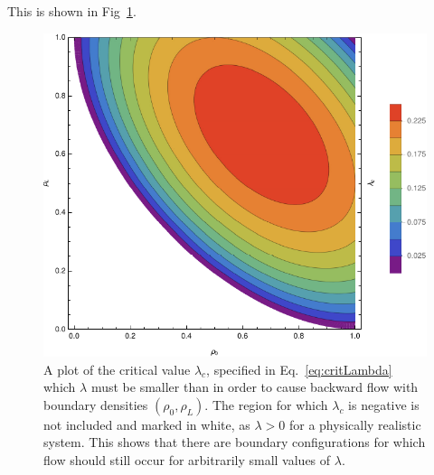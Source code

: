 This is shown in Fig~\ref{fig:critLambda}.
\begin{figure}[h!]
 \caption[The dependence of the critial value of $\lambda$ required for backward diffusion on the boundary conditions.]{\label{fig:critLambda} A plot of the critical value $\lambda_c$, specified in Eq.~\ref{eq:critLambda}
 which $\lambda$ must be smaller than in order to cause backward flow with boundary densities $(\rho_0, \rho_L)$. The region for which $\lambda_c$ is negative is not included and marked in white, as $\lambda>0$ for a physically
 realistic system. This shows that there are boundary configurations for which flow should still occur for arbitrarily small values of $\lambda$.}
 \includegraphics[width=0.99\linewidth]{analytics/images/criticalLambda}
\end{figure}

